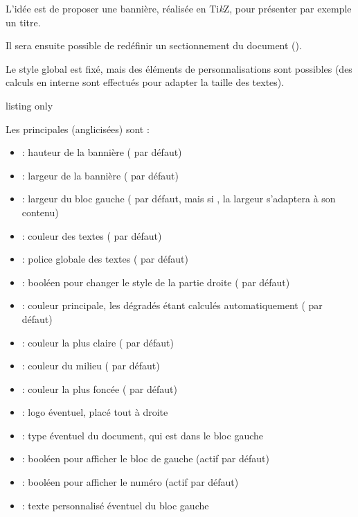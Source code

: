 \documentclass[french,11pt,a4paper]{article}
\providecommand\tikzlogo{Ti\textit{k}Z}
\let\TikZ\tikzlogo
\begin{document}
L'idée est de proposer une bannière, réalisée en \TikZ, pour présenter par exemple un titre.

Il sera ensuite possible de redéfinir un sectionnement du document ().

Le style global est fixé, mais des éléments de personnalisations sont possibles (des calculs en interne sont effectués pour adapter la taille des textes).

\begin{DemoCode}{listing only}
\end{DemoCode}

\begin{DemoCode}{}
\end{DemoCode}

Les principales  (anglicisées) sont :

\begin{itemize}
	\item {} : hauteur de la bannière (\MontreCode{2.5em} par défaut)
	\item {} : largeur de la bannière ( par défaut)
	\item {} : largeur du bloc gauche (\MontreCode{2.75em} par défaut, mais si , la largeur s'adaptera à son contenu)
	\item {} : couleur des textes ( par défaut)
	\item {} : police globale des textes ( par défaut)
	\item {} : booléen pour changer le style de la partie droite ( par défaut)
	\item {} : couleur principale, les dégradés étant calculés automatiquement ( par défaut)
	\item {} : couleur la plus claire ( par défaut)
	\item {} : couleur du milieu ( par défaut)
	\item {} : couleur la plus foncée ( par défaut)
	\item {} : logo éventuel, placé tout à droite
	\item {} : type éventuel du document, qui est dans le bloc gauche
	\item {} : booléen pour afficher le bloc de gauche (actif par défaut)
	\item {} : booléen pour afficher le numéro (actif par défaut)
	\item {} : texte personnalisé éventuel du bloc gauche
\end{itemize}
\end{document}
